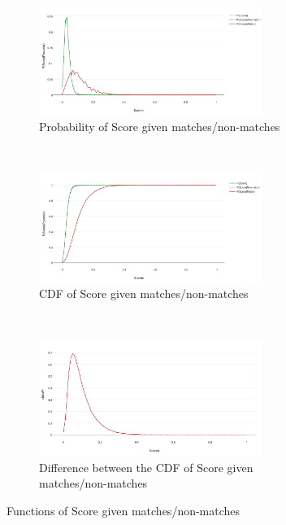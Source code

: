 \begin{figure}[htbp]
  \centering
  \begin{subfigure}[t]{\textwidth}
      \centering
      \includegraphics[width=0.8\textwidth]{dataset/otago/psm}
        \caption{Probability of Score given matches/non-matches}
      \label{fig:otago_psm} %
    \end{subfigure}%
  \\
  \begin{subfigure}[t]{\textwidth}
      \centering
      \includegraphics[width=0.8\textwidth]{dataset/otago/csm}
        \caption{CDF of Score given matches/non-matches}
      \label{fig:otago_csm} %
    \end{subfigure}%
  \\
  \begin{subfigure}[t]{\textwidth}
      \centering
      \includegraphics[width=0.8\textwidth]{dataset/otago/dsm}
        \caption{Difference between the CDF of Score given matches/non-matches}
        \label{fig:otago_dsm} %
    \end{subfigure}%
  \caption{Functions of Score given matches/non-matches}
  \label{fig:otago_sm} %
\end{figure}

